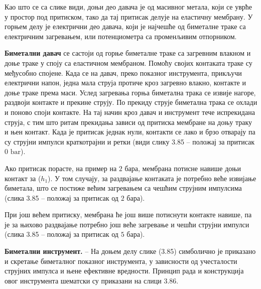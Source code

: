 \documentclass[12pt,a4paper]{report}
\begin{document}
Као што се са слике види, доњи део давача је од масивног метала, који се уврће у простор под притиском, тако да тај притисак делује на еластичну мембрану. У горњем делу је електрични део давача, који је најчешће од биметалне траке са електричним загревањем, или потенциометра са променљивим отпорником.

\textbf{Биметални давач} се састоји од горње биметалне траке са загревним влакном и доње траке у споју са еластичном мембраном. Помоћу својих контаката траке су међусобно спојене. Када се на давач, преко показног инструмента, прикључи електрични напон, једна мала струја протиче кроз загревно влакно, контакте и доње траке према маси. Услед загревања горња биметална трака се извије нагоре, раздвоји контакте и прекине струју. По прекиду струје биметална трака се охлади и поново споји контакте. На тај начин кроз
давач и инструмент тече испрекидана струја, с тим што ритам прекидања зависи од притиска мембране на доњу траку и њен контакт. Када је притисак једнак нули, контакти се лако и брзо отварају па су струјни импулси краткотрајни и ретки (види слику 3.85 – положај за притисак $0\text{ bar}$).

Ако притисак порасте, на пример на $2\text{ бара}$, мембрана потисне навише доњи контакт за ($h_1$). У том случају, за раздвајање контаката је потребно веће извијање биметала, што се постиже већим загревањем са чешћим струјним импулсима (слика 3.85 – положај за притисак од $2\text{ бара}$).


При још већем притиску, мембрана ће још више потиснути контакте навише, па је за њихово раздвајање потребно још веће загревање и чешћи струјни импулси (слика 3.85 – положај за притисак од $5\text{ бара}$).

\textbf{Биметални инструмент.} – На доњем делу слике (3.85) симболично је приказано и скретање биметалног показног инструмента, у зависности од учесталости струјних импулса и њене ефективне вредности. Принцип рада и конструкција овог инструмента шематски су приказани на слици 3.86.
\end{document}

